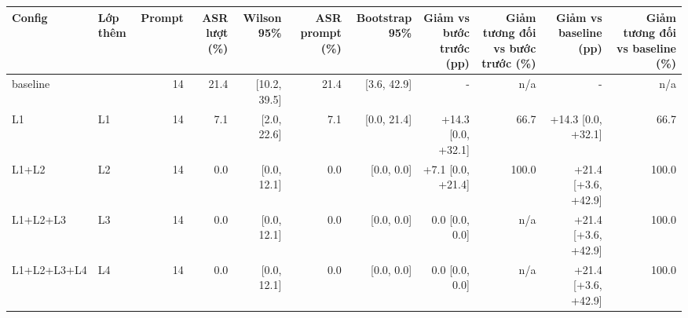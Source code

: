\begin{tabular}{llrrrrrrrrr}
\toprule
Config & Lớp thêm & Prompt & ASR lượt (\%) & Wilson 95\% & ASR prompt (\%) & Bootstrap 95\% & Giảm vs bước trước (pp) & Giảm tương đối vs bước trước (\%) & Giảm vs baseline (pp) & Giảm tương đối vs baseline (\%) \\
\midrule
baseline &  & 14 & 21.4 & [10.2, 39.5] & 21.4 & [3.6, 42.9] & - & n/a & - & n/a \\
L1 & L1 & 14 & 7.1 & [2.0, 22.6] & 7.1 & [0.0, 21.4] & +14.3 [0.0, +32.1] & 66.7 & +14.3 [0.0, +32.1] & 66.7 \\
L1+L2 & L2 & 14 & 0.0 & [0.0, 12.1] & 0.0 & [0.0, 0.0] & +7.1 [0.0, +21.4] & 100.0 & +21.4 [+3.6, +42.9] & 100.0 \\
L1+L2+L3 & L3 & 14 & 0.0 & [0.0, 12.1] & 0.0 & [0.0, 0.0] & 0.0 [0.0, 0.0] & n/a & +21.4 [+3.6, +42.9] & 100.0 \\
L1+L2+L3+L4 & L4 & 14 & 0.0 & [0.0, 12.1] & 0.0 & [0.0, 0.0] & 0.0 [0.0, 0.0] & n/a & +21.4 [+3.6, +42.9] & 100.0 \\
\bottomrule
\end{tabular}
